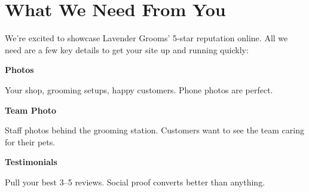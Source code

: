 \documentclass[11pt,letterpaper]{article}
\begin{document}
\vspace{0.2em}

\section*{What We Need From You}

We’re excited to showcase Lavender Grooms’ 5‑star reputation online. All we need are a few key details to get your site up and running quickly:

\vspace{0.12em}

\noindent\begin{minipage}[t]{0.48\textwidth}
\begin{tcolorbox}[colframe=accent-teal, boxrule=1pt, left=0.7em, right=0.7em, top=0.5em, bottom=0.5em, arc=4pt, boxsep=0pt]
{\bfseries\small\color{accent-teal}Photos}

\vspace{0.15em}

{\small Your shop, grooming setups, happy customers. Phone photos are perfect.}
\end{tcolorbox}

\vspace{0.1em}

\begin{tcolorbox}[colframe=accent-teal, boxrule=1pt, left=0.7em, right=0.7em, top=0.5em, bottom=0.5em, arc=4pt, boxsep=0pt]
{\bfseries\small\color{accent-teal}Team Photo}

\vspace{0.15em}

{\small Staff photos behind the grooming station. Customers want to see the team caring for their pets.}
\end{tcolorbox}

\vspace{0.1em}

\begin{tcolorbox}[colframe=accent-teal, boxrule=1pt, left=0.7em, right=0.7em, top=0.5em, bottom=0.5em, arc=4pt, boxsep=0pt]
{\bfseries\small\color{accent-teal}Testimonials}

\vspace{0.15em}

{\small Pull your best 3--5 reviews. Social proof converts better than anything.}
\end{tcolorbox}
\end{minipage}
\hfill
\end{document}

